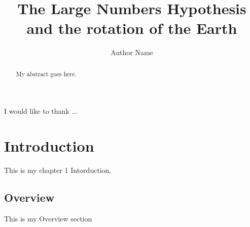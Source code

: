 \documentclass[master, copyright]{resources/class/ms_thesis}
\title{The Large Numbers Hypothesis and the rotation of the Earth}
\author{Author Name}
\begin{document}
\frontpages  
%




\begin{abstract}      
My abstract goes here.
\end{abstract}





\begin{acknowledgements}
I would like to thank ...
\end{acknowledgements}


\startthesis
%
%
%
%
%
		\tableofcontents           %

\chapter{Introduction}
This is my chapter 1 Intorduction.
\section{Overview}
This is my Overview section
\newpage
\end{document}
